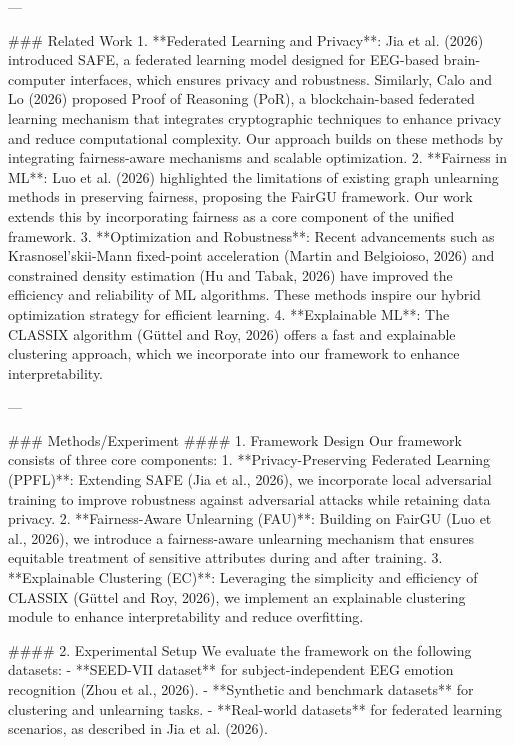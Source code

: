 ---

### Related Work  
1. **Federated Learning and Privacy**: Jia et al. (2026) introduced SAFE, a federated learning model designed for EEG-based brain-computer interfaces, which ensures privacy and robustness. Similarly, Calo and Lo (2026) proposed Proof of Reasoning (PoR), a blockchain-based federated learning mechanism that integrates cryptographic techniques to enhance privacy and reduce computational complexity. Our approach builds on these methods by integrating fairness-aware mechanisms and scalable optimization.  
2. **Fairness in ML**: Luo et al. (2026) highlighted the limitations of existing graph unlearning methods in preserving fairness, proposing the FairGU framework. Our work extends this by incorporating fairness as a core component of the unified framework.  
3. **Optimization and Robustness**: Recent advancements such as Krasnosel'skii-Mann fixed-point acceleration (Martin and Belgioioso, 2026) and constrained density estimation (Hu and Tabak, 2026) have improved the efficiency and reliability of ML algorithms. These methods inspire our hybrid optimization strategy for efficient learning.  
4. **Explainable ML**: The CLASSIX algorithm (Güttel and Roy, 2026) offers a fast and explainable clustering approach, which we incorporate into our framework to enhance interpretability.  

---

### Methods/Experiment  
#### 1. Framework Design  
Our framework consists of three core components:  
1. **Privacy-Preserving Federated Learning (PPFL)**: Extending SAFE (Jia et al., 2026), we incorporate local adversarial training to improve robustness against adversarial attacks while retaining data privacy.  
2. **Fairness-Aware Unlearning (FAU)**: Building on FairGU (Luo et al., 2026), we introduce a fairness-aware unlearning mechanism that ensures equitable treatment of sensitive attributes during and after training.  
3. **Explainable Clustering (EC)**: Leveraging the simplicity and efficiency of CLASSIX (Güttel and Roy, 2026), we implement an explainable clustering module to enhance interpretability and reduce overfitting.  

#### 2. Experimental Setup  
We evaluate the framework on the following datasets:  
- **SEED-VII dataset** for subject-independent EEG emotion recognition (Zhou et al., 2026).  
- **Synthetic and benchmark datasets** for clustering and unlearning tasks.  
- **Real-world datasets** for federated learning scenarios, as described in Jia et al. (2026).  


